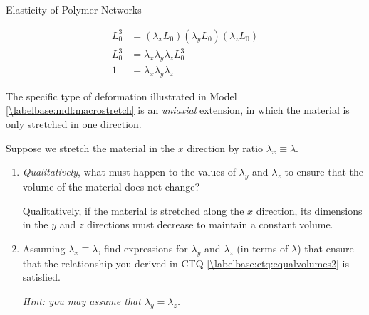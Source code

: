\begin{activity}{Elasticity of Polymer Networks}
\begin{ctqs}
\begin{enumerate}
		\begin{solution}[1.5in]
			\begin{align*}
				L_0^3 &= (\lambda_x L_0)(\lambda_y L_0)(\lambda_z L_0) \\
				L_0^3 & = \lambda_x \lambda_y \lambda_z L_0^3 \\
				1 &= \lambda_x \lambda_y \lambda_z
			\end{align*}
		\end{solution}
		
		\end{enumerate}
		
	\question The specific type of deformation illustrated in Model \ref{\labelbase:mdl:macrostretch} is an \emph{uniaxial} extension, in which the material is only stretched in one direction.
	
		Suppose we stretch the material in the $x$ direction by ratio $\lambda_x \equiv \lambda$.  
		
			\begin{enumerate}
				\item \emph{Qualitatively}, what must happen to the values of $\lambda_y$ and $\lambda_z$ to ensure that the volume of the material does not change?
				
					\begin{solution}[1in]
						Qualitatively, if the material is stretched along the $x$ direction, its dimensions in the $y$ and $z$ directions must decrease to maintain a constant volume.
					\end{solution}
				
				\item Assuming $\lambda_x \equiv \lambda$, find expressions for $\lambda_y$ and $\lambda_z$ (in terms of $\lambda$) that ensure that the relationship you derived in CTQ \ref{\labelbase:ctq:equalvolumes2} is satisfied.
		
				\emph{Hint: you may assume that $\lambda_y = \lambda_z$.}
				
					\begin{solution}[1.5in]\end{solution}
				

\end{enumerate}
\end{ctqs}
\end{activity}
